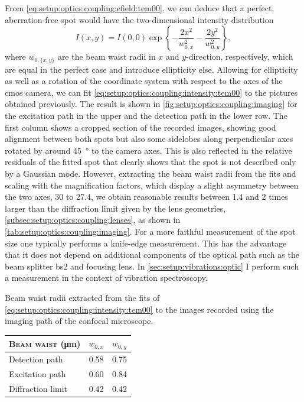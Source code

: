 From \cref{eq:setup:optics:coupling:efield:tem00}, we can deduce that a perfect, aberration-free spot would have the two-dimensional intensity distribution
\begin{equation}\label{eq:setup:optics:coupling:intensity:tem00}
    I(x, y) = I(0, 0) \exp\left\lbrace -\frac{2 x^2}{w_{0,x}^2} -\frac{2 y^2}{w_{0,y}^2} \right\rbrace,
\end{equation}
where $w_{0,\lbrace x,y\rbrace}$ are the beam waist radii in $x$ and $y$-direction, respectively, which are equal in the perfect case and introduce ellipticity else.
Allowing for ellipticity as well as a rotation of the coordinate system with respect to the axes of the \gls{cmos} camera, we can fit \cref{eq:setup:optics:coupling:intensity:tem00} to the pictures obtained previously.
The result is shown in \cref{fig:setup:optics:coupling:imaging} for the excitation path in the upper and the detection path in the lower row.
The first column shows a cropped section of the recorded images, showing good alignment between both spots but also some sidelobes along perpendicular axes rotated by around \qty{45}{\degree} to the camera axes.
This is also reflected in the relative residuals of the fitted spot that clearly shows that the spot is not described only by a Gaussian  mode.
However, extracting the beam waist radii from the fits and scaling with the magnification factors, which display a slight asymmetry between the two axes, \num{30} to \num{27.4}, we obtain reasonable results between \num{1.4} and \num{2} times larger than the diffraction limit given by the lens geometries, \cf \cref{subsec:setup:optics:coupling:lenses}, as shown in \cref{tab:setup:optics:coupling:imaging}.
For a more faithful measurement of the spot size one typically performs a knife-edge measurement.
This has the advantage that it does not depend on additional components of the optical path such as the beam splitter \acrshort{bs}2 and focusing lens.
In \cref{sec:setup:vibrations:optic} I perform such a measurement in the context of vibration spectroscopy.

\begin{margintable}
    \centering
    \footnotesize
    \caption{
        Beam waist radii extracted from the fits of \cref{eq:setup:optics:coupling:intensity:tem00} to the images recorded using the imaging path of the confocal microscope.
    }
    \label{tab:setup:optics:coupling:imaging}
    \begin{tabular}{lSS}
        \toprule
        \textsc{Beam waist} (\unit{\micro\meter})    & $w_{0, x}$ & $w_{0, y}$ \\
        \midrule
        Detection path                               & 0.58       & 0.75 \\
        Excitation path                              & 0.60       & 0.84 \\
        Diffraction limit                            & 0.42       & 0.42 \\
        \bottomrule
    \end{tabular}
\end{margintable}

